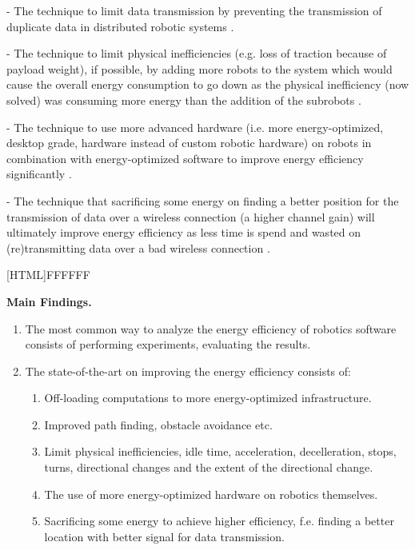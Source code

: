 \vspace{2mm}

- The technique to limit data transmission by preventing the transmission of duplicate data in distributed robotic systems \cite{huh2013distributed_swarm}.

\vspace{2mm}

- The technique to limit physical inefficiencies (e.g. loss of traction because of payload weight), if possible, by adding more robots to the system which would cause the overall
energy consumption to go down as the physical inefficiency (now solved) was consuming more energy than the addition of the subrobots \cite{kim2016firefighting_robot}.
    
\vspace{2mm}

- The technique to use more advanced hardware (i.e. more energy-optimized, desktop grade, hardware instead of custom robotic hardware) 
on robots in combination with energy-optimized software to improve energy efficiency significantly \cite{cheng2018FPGA_image_recognition}.
    
\vspace{2mm}

- The technique that sacrificing some energy on finding a better position for the transmission of data over a wireless connection
(a higher channel gain) will ultimately improve energy efficiency as less time is spend and wasted on (re)transmitting 
data over a bad wireless connection \cite{licea2013wireless_comms}.

\vspace{5mm}

\noindent{}[HTML]{FFFFFF}{\parbox{0.47\textwidth}{%
\noindent \textbf{Main Findings.}
\begin{enumerate}[nolistsep]
\item The most common way to analyze the energy efficiency of robotics software consists of performing experiments, evaluating the results.
\item The state-of-the-art on improving the energy efficiency consists of:
    \begin{enumerate}
        \item Off-loading computations to more energy-optimized infrastructure.
        \item Improved path finding, obstacle avoidance etc.
        \item Limit physical inefficiencies, idle time, acceleration, decelleration, stops, turns, directional changes and the extent of the directional change.
        \item The use of more energy-optimized hardware on robotics themselves.
        \item Sacrificing some energy to achieve higher efficiency, f.e. finding a better location with better signal for data transmission.
    \end{enumerate}
\end{enumerate}}}

